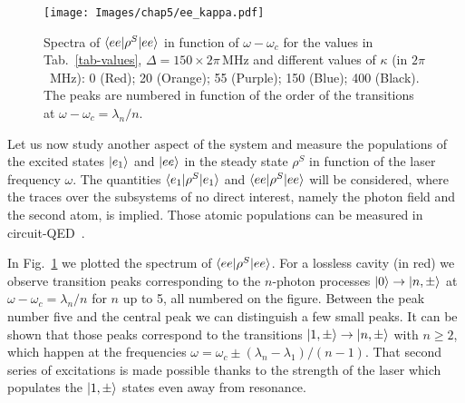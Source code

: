 

\begin{figure}
    \center
    \texttt{[image: Images/chap5/ee\_kappa.pdf]}
    \caption[ $\prodsc{ee}{\rho^S}{ee}$ in function of $\omega-\omega_c$]{ Spectra of $\prodsc{ee}{\rho^S}{ee}$ in function of $\omega-\omega_c$ for the values in Tab.~\ref{tab-values}, $\Delta=150 \times 2\pi\,\mbox{MHz}$ and different values of $\kappa$ (in $2\pi$~MHz): 0 (Red); 20 (Orange); 55 (Purple); 150 (Blue); 400 (Black). The peaks are numbered in function of the order of the transitions at $\omega-\omega_c=\lambda_n/n$. }
    \label{fig-ee_kappa}
\end{figure}

Let us now study another aspect of the system and measure the populations of the excited states $| e_1 \rangle$ and $| ee \rangle$ in the steady state $\rho^S$ in function of the laser frequency $\omega$. The quantities $\langle e_1 | \rho^S | e_1 \rangle$ and $\prodsc{ee}{\rho^S}{ee}$ will be considered, where the traces over the subsystems of no direct interest, namely the photon field and the second atom, is implied. Those atomic populations can be measured in circuit-QED~\cite{Fil09}.

In Fig.~\ref{fig-ee_kappa} we plotted the spectrum of $\prodsc{ee}{\rho^S}{ee}$. For a lossless cavity (in red) we observe transition peaks corresponding to the $n$-photon processes $| 0 \rangle \rightarrow | n,\pm \rangle$ at $\omega-\omega_c=\lambda_n/n$ for $n$ up to 5, all numbered on the figure. Between the peak number five and the central peak we can distinguish a few small peaks. It can be shown that those peaks correspond to the transitions $| 1,\pm \rangle \rightarrow | n,\pm \rangle$ with $n\ge2$, which happen at the frequencies $\omega=\omega_c \pm (\lambda_n-\lambda_1)/(n-1)$. That second series of excitations is made possible thanks to the strength of the laser which populates the $| 1,\pm \rangle$ states even away from resonance.


